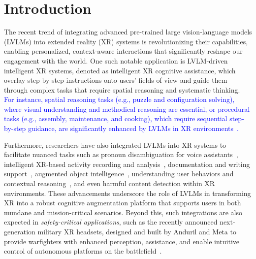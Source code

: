 \documentclass[sigconf,review,anonymous]{acmart}
\begin{document}
\section{Introduction}
The recent trend of integrating advanced pre-trained large vision-language models (LVLMs) into extended reality (XR) systems is revolutionizing their capabilities, enabling personalized, context-aware interactions that significantly reshape our engagement with the world. One such notable application is LVLM-driven intelligent XR systems, denoted as intelligent XR cognitive assistance, which overlay step-by-step instructions onto users' fields of view and guide them through complex tasks that require spatial reasoning and systematic thinking. \textcolor{blue}{For instance, spatial reasoning tasks (e.g., puzzle and configuration solving), where visual understanding and methodical reasoning are essential, or procedural tasks (e.g., assembly, maintenance, and cooking), which require sequential step-by-step guidance, are significantly enhanced by LVLMs in XR environments~\cite{wang2025cuberobot, ren2025rubikon, srinidhi2024xair, ghasemi2023embedding, zhao2025guided, qorbani2025teaching, dugar2024augmented, vir2024archef, lau2025adaptive, qu2024looking}.} 




Furthermore, researchers have also integrated LVLMs into XR systems to facilitate nuanced tasks such as pronoun disambiguation for voice assistants~\cite{lee2024gazepointar}, intelligent XR-based activity recording and analysis~\cite{janaka2024tom}, documentation and writing support~\cite{cai2024pandalens}, augmented object intelligence~\cite{dogan2024augmented}, understanding user behaviors and contextual reasoning~\cite{kim2025explainable}, and even harmful content detection within XR environments. These advancements underscore the role of LVLMs in transforming XR into a robust cognitive augmentation platform that supports users in both mundane and mission-critical scenarios. Beyond this, such integrations are also expected in \emph{safety-critical applications}, such as the recently announced next-generation military XR headsets, designed and built by Anduril and Meta to provide warfighters with enhanced perception, assistance, and enable intuitive control of autonomous platforms on the battlefield~\cite{anduril2025meta}.
\end{document}
